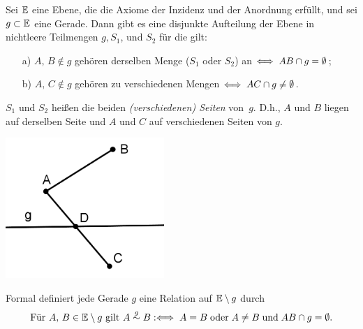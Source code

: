 
\begin{thm}\label{thm:satz.s1a}
Sei $\mathbb E$ eine Ebene, die die Axiome der Inzidenz und der
Anordnung erfüllt, und
sei $g\subset \mathbb E$ eine Gerade. 
Dann gibt es eine disjunkte Aufteilung der Ebene in nichtleere Teilmengen $g,
S_1$, und $S_2$ für die gilt:
\begin{enumerate}
    \item[a)] $A,\,B\notin g$ geh\"{o}ren derselben Menge ($S_1$ oder
    $S_2$) an $\Longleftrightarrow\;{AB}\cap g=\emptyset$;
    \item[b)] $A,\,C\notin g$ geh\"{o}ren zu verschiedenen Mengen
    $\Longleftrightarrow\;{AC}\cap g\neq\emptyset$.
\end{enumerate}
\end{thm}


$S_1$ und $S_2$ hei{\ss}en die beiden \emph{(verschiedenen) Seiten}
von~$g$. D.h., $A$ und $B$ liegen auf derselben Seite und $A$ und $C$ auf
    verschiedenen Seiten von $g$.


\centerline{\includegraphics[width=6cm]{BILDER/1-1-06a-Seiten.png}}


Formal definiert jede Gerade $g$ eine Relation auf
$\mathbb E\setminus g$ durch
\[
\mbox{Für } A,\,B\in\mathbb E\setminus g
\mbox{ gilt } A\stackrel{g}{\sim} B
:\Longleftrightarrow\;A=B\;\mbox{oder}\;A\neq B\;\mbox{und}\;
    {AB}\cap g=\emptyset.
\]


